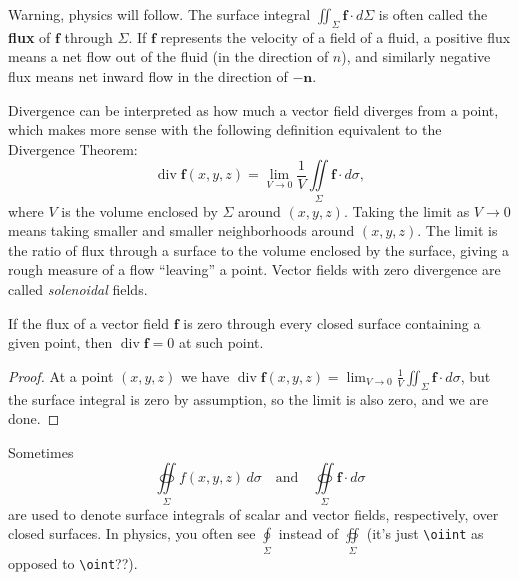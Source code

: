 \begin{note}
    Warning, physics will follow. The surface integral $\iint_{\Sigma}\mathbf f \cdot d\Sigma$ is often called the \textbf{flux} of $\mathbf f$ through $\Sigma$. If $\mathbf f$ represents the velocity of a field of a fluid, a positive flux means a net flow out of the fluid (in the direction of $n$), and similarly negative flux means net inward flow in the direction of $-\mathbf n$. 

    Divergence can be interpreted as how much a vector field diverges from a point, which makes more sense with the following definition equivalent to the Divergence Theorem: \[
        \operatorname{div}\mathbf f(x,y,z)= \lim_{V\to 0}\frac{1}{V}\iint\limits_{\Sigma}\mathbf f\cdot d\sigma,
    \] where $V$ is the volume enclosed by $\Sigma$ around $(x,y,z)$. Taking the limit as $V\to 0$ means taking smaller and smaller neighborhoods around $(x,y,z)$. The limit is the ratio of flux through a surface to the volume enclosed by the surface, giving a rough measure of a flow ``leaving'' a point. Vector fields with zero divergence are called \emph{solenoidal} fields.
\end{note}
\begin{cor}
    If the flux of a vector field $\mathbf f$ is zero through every closed surface containing a given point, then $\operatorname{div}\mathbf f=0$ at such point.
\end{cor}
\begin{proof}
    At a point $(x,y,z)$ we have $\operatorname{div}\mathbf f(x,y,z)=\lim_{V\to 0}\frac{1}{V}\iint_{\Sigma}\mathbf f\cdot d\sigma$, but the surface integral is zero by assumption, so the limit is also zero, and we are done.
\end{proof}
\begin{note}
    Sometimes \[
        \oiint\limits_{\Sigma}f(x,y,z)\,d\sigma \quad \text{and} \quad \oiint\limits_{\Sigma}\mathbf f\cdot d\sigma
    \] are used to denote surface integrals of scalar and vector fields, respectively, over closed surfaces. In physics, you often see $\oint\limits_{\Sigma}$ instead of $\oiint\limits_{\Sigma}$ (it's just \texttt{\textbackslash oiint} as opposed to \texttt{\textbackslash oint}??).
\end{note}
